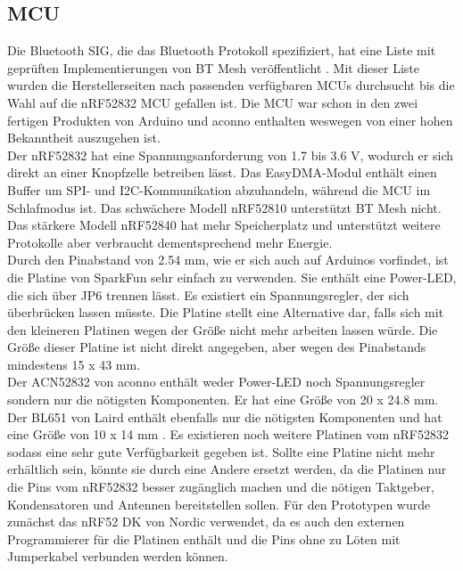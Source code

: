 \subsection{MCU}
\label{ch:mcu}
Die Bluetooth SIG, die das Bluetooth Protokoll spezifiziert, hat eine Liste mit geprüften Implementierungen von BT Mesh veröffentlicht \cite{site_qualifiedMesh}.
Mit dieser Liste wurden die Herstellerseiten nach passenden verfügbaren MCUs durchsucht bis die Wahl auf die nRF52832 MCU gefallen ist.
Die MCU war schon in den zwei fertigen Produkten von Arduino und aconno enthalten weswegen von einer hohen Bekanntheit auszugehen ist.\\
Der nRF52832 hat eine Spannungsanforderung von 1.7 bis 3.6 V, wodurch er sich direkt an einer Knopfzelle betreiben lässt.
Das EasyDMA-Modul enthält einen Buffer um SPI- und I2C-Kommunikation abzuhandeln, während die MCU im Schlafmodus ist.
Das schwächere Modell nRF52810 unterstützt BT Mesh nicht.
Das stärkere Modell nRF52840 hat mehr Speicherplatz und unterstützt weitere Protokolle aber verbraucht dementsprechend mehr Energie. \cite{site_nrfProducts}\\
Durch den Pinabstand von 2.54 mm, wie er sich auch auf Arduinos vorfindet, ist die Platine von SparkFun sehr einfach zu verwenden.
Sie enthält eine Power-LED, die sich über JP6 trennen lässt.
Es existiert ein Spannungsregler, der sich überbrücken lassen müsste.
Die Platine stellt eine Alternative dar, falls sich mit den kleineren Platinen wegen der Größe nicht mehr arbeiten lassen würde.
Die Größe dieser Platine ist nicht direkt angegeben, aber wegen des Pinabstands mindestens 15 x 43 mm. \cite{datasheet_nrfSpark}\\
Der ACN52832 von aconno enthält weder Power-LED noch Spannungsregler sondern nur die nötigsten Komponenten.
Er hat eine Größe von 20 x 24.8 mm. \cite{datasheet_nrfAcn}\\
Der BL651 von Laird enthält ebenfalls nur die nötigsten Komponenten und hat eine Größe von 10 x 14 mm \cite{datasheet_nrfLaird}.
Es existieren noch weitere Platinen vom nRF52832 sodass eine sehr gute Verfügbarkeit gegeben ist.
Sollte eine Platine nicht mehr erhältlich sein, könnte sie durch eine Andere ersetzt werden, da die Platinen nur die Pins vom nRF52832 besser zugänglich machen und die nötigen Taktgeber, Kondensatoren und Antennen bereitstellen sollen.
Für den Prototypen wurde zunächst das nRF52 DK von Nordic verwendet, da es auch den externen Programmierer für die Platinen enthält und die Pins ohne zu Löten mit Jumperkabel verbunden werden können.

